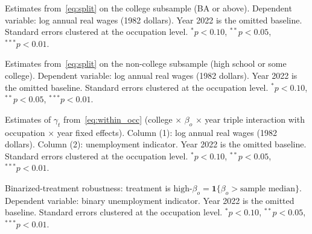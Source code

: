 \documentclass[11pt]{article}
\theoremstyle{plain}
\theoremstyle{remark}
\begin{document}
\begin{table}[H]
\begin{center}
\caption{Estimates from~\eqref{eq:split} on the college subsample (BA or above). Dependent variable: log annual real wages (1982 dollars). Year 2022 is the omitted baseline. Standard errors clustered at the occupation level. $^{*}p<0.10$, $^{**}p<0.05$, $^{***}p<0.01$.}
\label{tab:lw_col}
\resizebox{0.9\textwidth}{!}{}
\end{center}
\end{table}

\begin{table}[H]
\begin{center}
\caption{Estimates from~\eqref{eq:split} on the non-college subsample (high school or some college). Dependent variable: log annual real wages (1982 dollars). Year 2022 is the omitted baseline. Standard errors clustered at the occupation level. $^{*}p<0.10$, $^{**}p<0.05$, $^{***}p<0.01$.}
\label{tab:lw_noncol}
\resizebox{0.9\textwidth}{!}{}
\end{center}
\end{table}

\begin{table}[H]
\begin{center}
\caption{Estimates of $\gamma_t$ from~\eqref{eq:within_occ} (college $\times$ $\beta_o$ $\times$ year triple interaction with occupation $\times$ year fixed effects). Column (1): log annual real wages (1982 dollars). Column (2): unemployment indicator. Year 2022 is the omitted baseline. Standard errors clustered at the occupation level. $^{*}p<0.10$, $^{**}p<0.05$, $^{***}p<0.01$.}
\label{tab:lw_within_occ}
{\footnotesize}
\end{center}
\end{table}

\begin{table}[H]
\begin{center}
\caption{Binarized-treatment robustness: treatment is $\text{high-}\beta_o = \mathbf{1}\{\beta_o > \text{sample median}\}$. Dependent variable: binary unemployment indicator. Year 2022 is the omitted baseline. Standard errors clustered at the occupation level. $^{*}p<0.10$, $^{**}p<0.05$, $^{***}p<0.01$.}
\label{tab:unemp_main_bin}
\resizebox{0.9\textwidth}{!}{}
\end{center}
\end{table}
\end{document}
